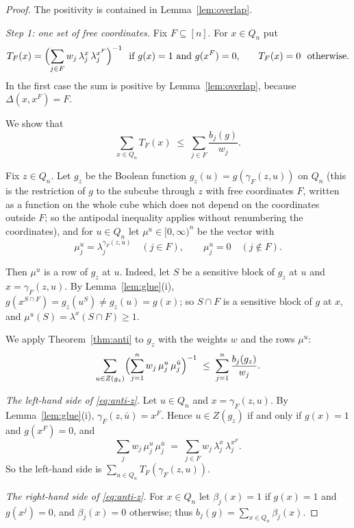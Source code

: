 \documentclass[11pt,reqno]{amsart}
\theoremstyle{definition}
\theoremstyle{remark}
\numberwithin{equation}{section}
\theoremstyle{named}
\theoremstyle{plain}
\begin{document}
\begin{proof}
The positivity is contained in Lemma~\ref{lem:overlap}.

\smallskip
\emph{Step 1: one set of free coordinates.} Fix $F\subseteq[n]$. For $x\in Q_n$ put
\[
   T_F(x)=\Bigl(\sum_{j\in F}w_j\,\lambda^{x}_j\,\lambda^{x^{F}}_j\Bigr)^{-1}
   \ \ \text{if $g(x)=1$ and $g(x^{F})=0$,}\qquad T_F(x)=0\ \ \text{otherwise.}
\]
In the first case the sum is positive by Lemma~\ref{lem:overlap}, because $\Delta(x,x^{F})=F$.

We
show that
\begin{equation}\label{eq:pairsF}
   \sum_{x\in Q_n}T_F(x)\;\le\;\sum_{j\in F}\frac{b_j(g)}{w_j}.
\end{equation}

Fix $z\in Q_n$. Let $g_{z}$ be the Boolean function $g_{z}(u)=g(\gamma_F(z,u))$ on $Q_n$ (this is
the restriction of $g$ to the subcube through $z$ with free coordinates $F$, written as a function
on the whole cube which does not depend on the coordinates outside $F$; so the antipodal
inequality applies without renumbering the coordinates), and
for $u\in Q_n$ let $\mu^{u}\in[0,\infty)^{n}$ be the vector with
\[
   \mu^{u}_j=\lambda^{\gamma_F(z,u)}_j\quad(j\in F),\qquad \mu^{u}_j=0\quad(j\notin F).
\]

Then $\mu^{u}$ is a row of $g_{z}$ at $u$. Indeed, let $S$ be a sensitive block of $g_{z}$ at $u$
and $x=\gamma_F(z,u)$. By Lemma~\ref{lem:glue}(i),
$g(x^{S\cap F})=g_{z}(u^{S})\ne g_{z}(u)=g(x)$; so $S\cap F$ is a sensitive block of $g$ at $x$, and
$\mu^{u}(S)=\lambda^{x}(S\cap F)\ge1$.

We apply Theorem~\ref{thm:anti} to $g_{z}$ with the weights
$w$ and the rows $\mu^{u}$:
\begin{equation}\label{eq:anti-z}
   \sum_{u\in Z(g_{z})}\Bigl(\sum_{j=1}^{n}w_j\,\mu^{u}_j\,\mu^{\bar u}_j\Bigr)^{-1}
   \;\le\;\sum_{j=1}^{n}\frac{b_j(g_{z})}{w_j}.
\end{equation}

\smallskip
\emph{The left-hand side of \eqref{eq:anti-z}.} Let $u\in Q_n$ and $x=\gamma_F(z,u)$. By
Lemma~\ref{lem:glue}(i), $\gamma_F(z,\bar u)=x^{F}$. Hence $u\in Z(g_{z})$ if and only if $g(x)=1$
and $g(x^{F})=0$, and
\[
   \sum_{j}w_j\,\mu^{u}_j\,\mu^{\bar u}_j\;=\;\sum_{j\in F}w_j\,\lambda^{x}_j\,\lambda^{x^{F}}_j .
\]
So the left-hand
side is $\sum_{u\in Q_n}T_F(\gamma_F(z,u))$.

\smallskip
\emph{The right-hand side of \eqref{eq:anti-z}.} For $x\in Q_n$ let $\beta_j(x)=1$ if $g(x)=1$ and
$g(x^{j})=0$, and $\beta_j(x)=0$ otherwise; thus $b_j(g)=\sum_{x\in Q_n}\beta_j(x)$.


\end{proof}
\end{document}
